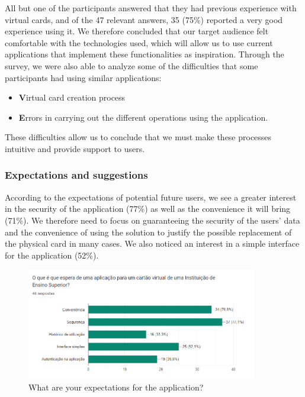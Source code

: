 \documentclass[10pt]{article}
\begin{document}
All but one of the participants answered that they had previous experience with virtual cards, and of the 47 relevant answers, 35 (75\%) reported a very good experience using it. We therefore concluded that our target audience felt comfortable with the technologies used, which will allow us to use current applications that implement these functionalities as inspiration.
Through the survey, we were also able to analyze some of the difficulties that some participants had using similar applications:
\begin{itemize}
    \item \textbf Virtual card creation process
    \item \textbf Errors in carrying out the different operations using the application.
\end{itemize}


These difficulties allow us to conclude that we must make these processes intuitive and provide support to users.



\subsubsection{Expectations and suggestions}

According to the expectations of potential future users, we see a greater interest in the security of the application (77\%) as well as the convenience it will bring (71\%). We therefore need to focus on guaranteeing the security of the users' data and the convenience of using the solution to justify the possible replacement of the physical card in many cases.
We also noticed an interest in a simple interface for the application (52\%).

\begin{figure}[h]
    \centering
    \includegraphics[width=0.9\textwidth]{report-images/questionaire4.png}
    \caption{What are your expectations for the application?}
    \label{fig:fig-6}
\end{figure}
\end{document}
